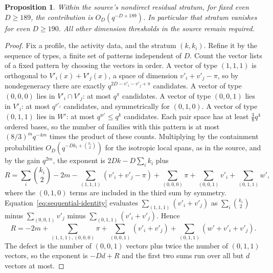 \documentclass[11pt]{article}
\newtheorem{proposition}{Proposition}
\begin{document}
\begin{proposition}\label{prop:residual-189}
Within the source's nondirect residual stratum, for fixed even $D\ge189$,
the contribution is $O_D(q^{-D+189})$. In particular that stratum vanishes
for even $D\ge190$. All other dimension thresholds in the source remain
required.
\end{proposition}
\begin{proof}
Fix a profile, the activity data, and the stratum $(k,k_i)$. Refine it by
the sequence of types, a finite set of patterns independent of $D$. Count
the vector lists of a fixed pattern by choosing the vectors in order.
A vector of type $(1,1,1)$ is orthogonal to $V'_i(x)+V'_j(x)$, a space of
dimension $v'_i+v'_j-\pi$, so by nondegeneracy there are exactly
$q^{2D-v'_i-v'_j+\pi}$ candidates. A vector of type $(0,0,0)$ lies in
$V'_i\cap V'_j$: at most $q^{\pi}$ candidates. A vector of type $(0,0,1)$
lies in $V'_i$: at most $q^{v'_i}$ candidates, and symmetrically for
$(0,1,0)$. A vector of type $(0,1,1)$ lies in $W'$: at most $q^{w'}\le q^k$
candidates. Each pair space has at least $\tfrac38q^4$ ordered bases, so
the number of families with this pattern is at most $(8/3)^mq^{-4m}$
times the product of these counts. Multiplying by the containment
probabilities $O_D(q^{-Dk_i+\binom{k_i}{2}})$ for the isotropic local spans,
as in the source, and by the gain $q^{2m}$, the exponent is
$2Dk-D\sum_ik_i$ plus
\[
 R=\sum_i\binom{k_i}{2}-2m
 -\sum_{(1,1,1)}(v'_i+v'_j-\pi)
 +\sum_{(0,0,0)}\pi+\sum_{(0,0,1)}v'_i+\sum_{(0,1,1)}w',
\]
where the $(0,1,0)$ terms are included in the third sum by symmetry.
Equation~\eqref{eq:sequential-identity} evaluates
$\sum_{(1,1,1)}(v'_i+v'_j)$ as $\sum_i\binom{k_i}{2}$ minus
$\sum_{(0,0,1)}v'_j$ minus $\sum_{(0,1,1)}(v'_i+v'_j)$. Hence
\begin{equation}\label{eq:sequential-remainder}
 R=-2m+\sum_{(1,1,1),(0,0,0)}\pi
 +\sum_{(0,0,1)}(v'_i+v'_j)+\sum_{(0,1,1)}(w'+v'_i+v'_j).
\end{equation}
The defect is the number of $(0,0,1)$ vectors plus twice the number of
$(0,1,1)$ vectors, so the exponent is $-Dd+R$ and the first two sums run
over all but $d$ vectors at most.


\end{proof}
\end{document}
